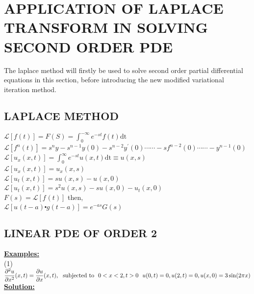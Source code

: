 \documentclass[12pt]{report}
\newcommand{\Laplace}{\mathcal{L}}
\newcommand{\ft}{f(t)}
\newcommand{\ftn}[1]{f^{#1}(t)}
\newcommand{\FS}{F(S)}
\newcommand{\LaplaceIntegral}{\int_{0}^{-\infty}e^{-st}\ft\text{dt}}
\newcommand{\sbracket}[1]{\left[#1\right]}
\newcommand{\Yn}[1]{y^{#1}(0)}
\newcommand{\fn}[1]{f^{#1}(0)}
\newcommand{\Sn}[1]{s^{#1}}
\newcommand{\LUx}[1]{\Laplace\sbracket{u_{#1}(x,t)}}
\newcommand{\Un}[2]{u_{#1}(#2)}
\newcommand{\LInt}{\int_{0}^{\infty}e^{-st}u(x,t)\text{dt}}
\newcommand{\LFt}{\Laplace \sbracket{\ftn{}}}
\newcommand{\NI}{\noindent}
\begin{document}
\section{APPLICATION OF LAPLACE TRANSFORM IN SOLVING SECOND ORDER PDE}
The laplace method will firstly be used to solve second order partial differential equations in this section, before introducing the new modified variational iteration method.

\subsection{LAPLACE METHOD}

\NI $\Laplace\left[\ft\right] = \FS = \LaplaceIntegral$ \\[0.1cm]
$ \Laplace \sbracket{\ftn{n}}  = s^{n}y - \Sn{n-1}y(0) - \Sn{n-2}\Yn{\prime} \cdots\cdots - s\fn{n-2} \cdots\cdots - y^{n-1}(0) $ \\[0.1cm]
$\LUx{x} = \LInt \equiv u(x,s) $\\[0.1cm]
$\LUx{x} = \Un{x}{x,s}$\\[0.1cm]
$\LUx{t} = s\Un{}{x,s} - \Un{}{x,0}$\\[0.1cm]
$\LUx{t} = s^{2}\Un{}{x,s} - s\Un{}{x,0} - \Un{t}{x,0}$\\[0.1cm]
$F(s) = \LFt $ then,\\[0.2cm]
$\Laplace\sbracket{\Un{}{t-a}\centerdot g(t-a)} = e^{-as}G(s)$\\[.6cm]

\subsection{LINEAR PDE OF ORDER 2}

\NI \underline{\textbf{Examples:}}\\[0.2cm]

\NI (1) ${\displaystyle \frac{\partial^{2}u}{\partial x^{2}}(x,t) = \frac{\partial u}{\partial x}(x,t),~ \text{ subjected to }~0 < x < 2, t > 0  \text{ \text{ }} u(0,t) = 0, u(2,t) = 0, u(x,0) = 3\sin(2\pi x)}$\\

\NI \underline{\textbf{Solution:}}
\end{document}
